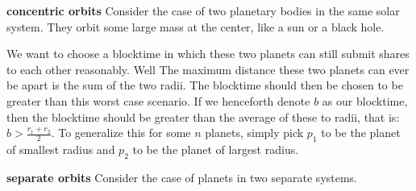 \documentclass[conference]{IEEEtran}
\begin{document}
\textbf{concentric orbits}
Consider the case of two planetary bodies in the same solar system. They orbit some large mass at the center, like a sun or a black hole. 
\begin{center}
\end{center}


We want to choose a blocktime in which these two planets can still submit shares to each other reasonably. Well The maximum distance these two planets can ever be apart is the sum of the two radii. The blocktime should then be chosen to be greater than this worst case scenario. If we henceforth denote $b$ as our blocktime, then the blocktime should be greater than the average of these to radii, that is: $b > \frac{r_1+r_2}{2}$. To generalize this for some $n$ planets, simply pick $p_1$ to be the planet of smallest radius and $p_2$ to be the planet of largest radius.

\textbf{separate orbits}
Consider the case of planets in two separate systems.
\begin{center}
\end{center}
\end{document}
